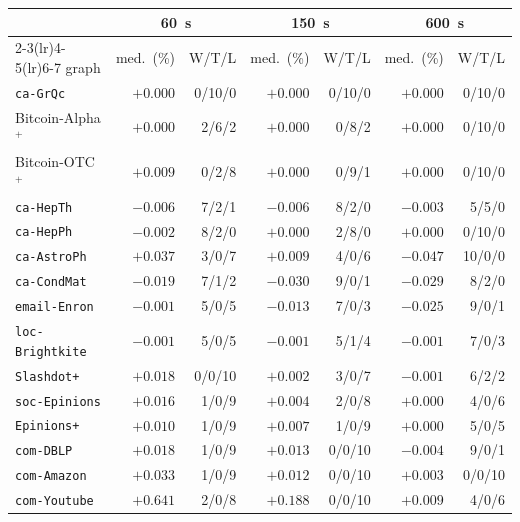 \begin{tabular}{lrrrrrr}
\toprule
 & \multicolumn{2}{c}{\SI{60}{s}} & \multicolumn{2}{c}{\SI{150}{s}} & \multicolumn{2}{c}{\SI{600}{s}} \\
\cmidrule(lr){2-3}\cmidrule(lr){4-5}\cmidrule(lr){6-7}
graph & med.\ (\%) & W/T/L & med.\ (\%) & W/T/L & med.\ (\%) & W/T/L \\
\midrule
\texttt{ca-GrQc} & $+0.000$ & 0/10/0 & $+0.000$ & 0/10/0 & $+0.000$ & 0/10/0 \\
Bitcoin-Alpha$^+$ & $+0.000$ & 2/6/2 & $+0.000$ & 0/8/2 & $+0.000$ & 0/10/0 \\
Bitcoin-OTC$^+$ & $+0.009$ & 0/2/8 & $+0.000$ & 0/9/1 & $+0.000$ & 0/10/0 \\
\texttt{ca-HepTh} & $-0.006$ & 7/2/1 & $-0.006$ & 8/2/0 & $-0.003$ & 5/5/0 \\
\texttt{ca-HepPh} & $-0.002$ & 8/2/0 & $+0.000$ & 2/8/0 & $+0.000$ & 0/10/0 \\
\texttt{ca-AstroPh} & $+0.037$ & 3/0/7 & $+0.009$ & 4/0/6 & $-0.047$ & 10/0/0 \\
\texttt{ca-CondMat} & $-0.019$ & 7/1/2 & $-0.030$ & 9/0/1 & $-0.029$ & 8/2/0 \\
\texttt{email-Enron} & $-0.001$ & 5/0/5 & $-0.013$ & 7/0/3 & $-0.025$ & 9/0/1 \\
\texttt{loc-Brightkite} & $-0.001$ & 5/0/5 & $-0.001$ & 5/1/4 & $-0.001$ & 7/0/3 \\
\texttt{Slashdot+} & $+0.018$ & 0/0/10 & $+0.002$ & 3/0/7 & $-0.001$ & 6/2/2 \\
\texttt{soc-Epinions} & $+0.016$ & 1/0/9 & $+0.004$ & 2/0/8 & $+0.000$ & 4/0/6 \\
\texttt{Epinions+} & $+0.010$ & 1/0/9 & $+0.007$ & 1/0/9 & $+0.000$ & 5/0/5 \\
\texttt{com-DBLP} & $+0.018$ & 1/0/9 & $+0.013$ & 0/0/10 & $-0.004$ & 9/0/1 \\
\texttt{com-Amazon} & $+0.033$ & 1/0/9 & $+0.012$ & 0/0/10 & $+0.003$ & 0/0/10 \\
\texttt{com-Youtube} & $+0.641$ & 2/0/8 & $+0.188$ & 0/0/10 & $+0.009$ & 4/0/6 \\
\bottomrule
\end{tabular}
